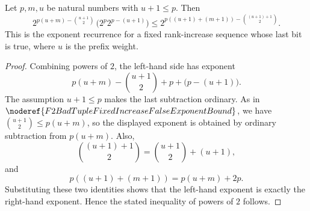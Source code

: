 \begin{helper}
Let \(p,m,u\) be natural numbers with \(u+1\le p\). Then
\[
2^{p(u+m)-\binom{u+1}{2}}\,
  \bigl(2^p2^{p-(u+1)}\bigr)
\le
2^{p((u+1)+(m+1))-\binom{(u+1)+1}{2}}.
\]
This is the exponent recurrence for a fixed rank-increase sequence whose last
bit is true, where \(u\) is the prefix weight.
\end{helper}
\begin{proof}
Combining powers of \(2\), the left-hand side has exponent
\[
  p(u+m)-\binom{u+1}{2}+p+\bigl(p-(u+1)\bigr).
\]
The assumption \(u+1\le p\) makes the last subtraction ordinary. As in
\(\noderef{F2BadTupleFixedIncreaseFalseExponentBound}\), we have
\(\binom{u+1}{2}\le p(u+m)\), so the displayed exponent is obtained by ordinary
subtraction from \(p(u+m)\). Also,
\[
  \binom{(u+1)+1}{2}=\binom{u+1}{2}+(u+1),
\]
and
\[
  p((u+1)+(m+1))=p(u+m)+2p.
\]
Substituting these two identities shows that the left-hand exponent is exactly
the right-hand exponent. Hence the stated inequality of powers of \(2\) follows.
\end{proof}
